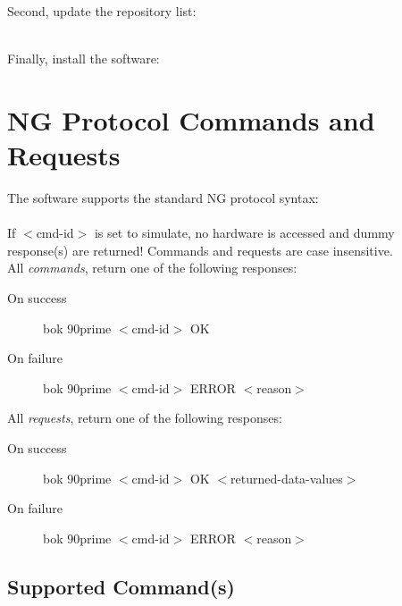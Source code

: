 \documentclass[12pt,twoside]{article}
\begin{document}
\noindent Second, update the repository list: \\


 \\

\noindent Finally, install the software: \\




\newpage
\section{NG Protocol Commands and Requests}
\label{AppendixC}

The software supports the standard NG protocol syntax: \\

 \\

\noindent If $<$cmd-id$>$ is set to {\sc simulate}, no hardware is accessed and dummy response(s) are returned!
Commands and requests are case insensitive. \\

\noindent All \emph{commands}, return one of the following responses:

 \begin{description}
  \item[On success] bok 90prime $<$cmd-id$>$ OK
  \item[On failure] bok 90prime $<$cmd-id$>$ ERROR $<$reason$>$
 \end{description}

\noindent All \emph{requests}, return one of the following responses:

 \begin{description}
  \item[On success] bok 90prime $<$cmd-id$>$ OK $<$returned-data-values$>$
  \item[On failure] bok 90prime $<$cmd-id$>$ ERROR $<$reason$>$
 \end{description}

\subsection{Supported Command(s)}
\end{document}
